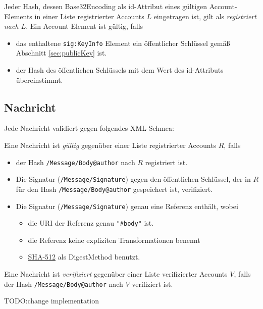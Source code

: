 \documentclass[a4paper,10pt]{article}
\begin{document}
Jeder Hash, dessen Base32Encoding als id-Attribut eines gültigen Account-Elements in einer Liste registrierter Accounts $L$  eingetragen ist, gilt als \emph{registriert nach $L$}. 
Ein Account-Element ist gültig, falls
\begin{itemize}
 \item das enthaltene \texttt{sig:KeyInfo} Element ein öffentlicher Schlüssel gemäß Abschnitt \ref{sec:publicKey} ist.
 \item der Hash des öffentlichen Schlüssels mit dem Wert des id-Attributs übereinstimmt.
\end{itemize}

\subsection{Nachricht}
Jede Nachricht validiert gegen folgendes XML-Schmea:


Eine Nachricht ist \emph{gültig} gegenüber einer Liste registrierter Accounts $R$, falls
\begin{itemize}
 \item der Hash \texttt{/Message/Body@author} nach $R$ registriert ist.
 \item Die Signatur (\texttt{/Message/Signature}) gegen den öffentlichen Schlüssel, der in $R$ für den Hash \texttt{/Message/Body@author} gespeichert ist, verifiziert.
 \item Die Signatur (\texttt{/Message/Signature}) genau eine Referenz enthält, wobei
 \begin{itemize}
  \item die URI der Referenz genau \texttt{"\#body"} ist.
  \item die Referenz keine expliziten Transformationen benennt
  \item \href{http://www.w3.org/2001/04/xmlenc#sha512}{SHA-512} als DigestMethod benutzt.
 \end{itemize}
\end{itemize}

Eine Nachricht ist \emph{verifiziert} gegenüber einer Liste verifizierter Accounts $V$, falls der Hash \texttt{/Message/Body@author} nach $V$ verifiziert ist.

TODO:change implementation
\end{document}
